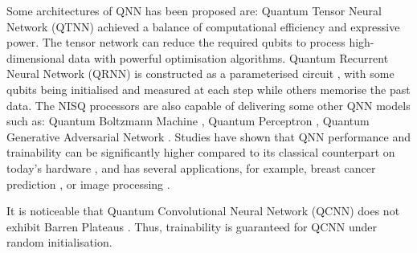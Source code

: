 Some architectures of QNN has been proposed are: 
Quantum Tensor Neural Network (QTNN) \cite{hugginsQuantumMachineLearning2019} achieved a balance of computational efficiency and expressive power. 
The tensor network can reduce the required qubits to process high-dimensional data with powerful optimisation algorithms.
Quantum Recurrent Neural Network (QRNN) is constructed as a parameterised circuit \cite{takakiLearningTemporalData2021}, with some qubits being initialised and measured at each step while others memorise the past data.
The NISQ processors are also capable of delivering some other QNN models such as: 
Quantum Boltzmann Machine \cite{shinguBoltzmannMachineLearning2021, zoufalVariationalQuantumBoltzmann2021}, 
Quantum Perceptron \cite{kristensenArtificialSpikingQuantum2021}, 
Quantum Generative Adversarial Network \cite{dallaire-demersQuantumGenerativeAdversarial2018, lloydQuantumGenerativeAdversarial2018}. Studies have shown that QNN performance and trainability can be significantly higher compared to its classical counterpart on today's hardware \cite{abbasPowerQuantumNeural2021, colesSeekingQuantumAdvantage2021}, and has several applications, for example, breast cancer prediction \cite{liModelAlgorithmQuantuminspired2014}, or image processing \cite{matsuiQubitNeuralNetwork2009}.

It is noticeable that Quantum Convolutional Neural Network (QCNN) does not exhibit Barren Plateaus \cite{pesahAbsenceBarrenPlateaus2021}.
Thus, trainability is guaranteed for QCNN under random initialisation.